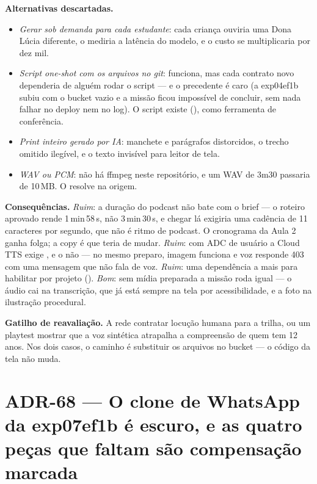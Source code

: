 \textbf{Alternativas descartadas.}
\begin{itemize}
  \item \emph{Gerar sob demanda para cada estudante}: cada criança ouviria uma
    Dona Lúcia diferente, o  mediria a latência do
    modelo, e o custo se multiplicaria por dez mil.
  \item \emph{Script one-shot com os arquivos no git}: funciona, mas cada
    contrato novo dependeria de alguém rodar o script --- e o precedente é caro
    (a exp04ef1b subiu com o bucket vazio e a missão ficou impossível de concluir,
    sem nada falhar no deploy nem no log). O script existe
    (), como ferramenta de
    conferência.
  \item \emph{Print inteiro gerado por IA}: manchete e parágrafos distorcidos, o
    trecho omitido ilegível, e o texto invisível para leitor de tela.
  \item \emph{WAV ou PCM}: não há ffmpeg neste repositório, e um WAV de 3m30
    passaria de 10\,MB. O  resolve na origem.
\end{itemize}

\textbf{Consequências.} \emph{Ruim}: a duração do podcast não bate com o brief
--- o roteiro aprovado rende 1\,min\,58\,s, não 3\,min\,30\,s, e chegar lá
exigiria uma cadência de 11 caracteres por segundo, que não é ritmo de podcast.
O cronograma da Aula 2 ganha folga; a copy é que teria de mudar. \emph{Ruim}:
com ADC de usuário a Cloud TTS exige , e o
 não --- no mesmo preparo, imagem funciona e voz responde 403 com
uma mensagem que não fala de voz. \emph{Ruim}: uma dependência a mais para
habilitar por projeto (). \emph{Bom}: sem mídia
preparada a missão roda igual --- o áudio cai na transcrição, que já está sempre
na tela por acessibilidade, e a foto na ilustração procedural.

\textbf{Gatilho de reavaliação.} A rede contratar locução humana para a trilha,
ou um playtest mostrar que a voz sintética atrapalha a compreensão de quem tem
12 anos. Nos dois casos, o caminho é substituir os arquivos no bucket --- o
código da tela não muda.


\section{ADR-68 --- O clone de WhatsApp da exp07ef1b é escuro, e as quatro peças
que faltam são compensação marcada}
\label{adr:exp07ef1b-clone-escuro}

